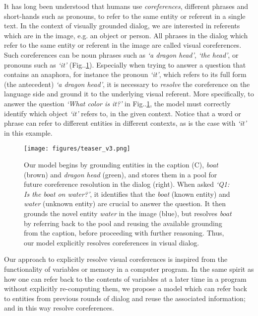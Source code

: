 \documentclass[runningheads]{llncs}
\makeatletter
\DeclareRobustCommand\onedot{\futurelet\@let@token\@onedot}
\def\@onedot{\ifx\@let@token.\else.\null\fi\xspace}
\def\Fig{Fig\onedot}
\makeatother
\begin{document}
It has long been understood 
\cite{grice1975logic,Winograd:1972:UNL:540414,mitchell-vandeemter-reiter:2013:NAACL-HLT,yu16eccv} 
that humans use \emph{coreferences}, different phrases and short-hands such as pronouns, to refer to the same entity or referent in a single text. In the context of visually grounded dialog, we are interested in referents which are in the image, e.g. an object or person. All phrases in the dialog which refer to the same entity or referent in the image are called visual coreferences.
Such coreferences can be noun phrases such as \emph{`a dragon head'}, 
\emph{`the head'}, or pronouns such as \emph{`it'} (\Fig\ref{fig:teaser}).
Especially when trying to answer a question that contains an anaphora, for
instance the pronoun \emph{`it'}, which refers to its full form (the antecedent) \emph{`a dragon head'}, it is necessary to \textit{resolve} the coreference 
on the language side and ground it to the underlying visual referent.
More specifically, to answer the question \textit{`What color is it?'} in
\Fig\ref{fig:teaser}, the model must correctly identify which object 
\textit{`it'} refers to, in the given context.
Notice that a word or phrase can refer to different entities in 
different contexts, as is the case with \textit{`it'} in this example.
\begin{figure}[t]
	\centering
    \texttt{[image: figures/teaser\_v3.png]}
\caption{
    Our model begins by grounding entities in the caption (C), \textit{boat} 
    (brown) and \textit{dragon head} (green), and stores them in a pool for 
    future coreference resolution in the dialog (right).
    When asked \textit{`Q1: Is the boat on water?'}, it identifies that
    the \textit{boat} (known entity) and \textit{water} (unknown entity) 
    are crucial to answer the question.
    It then grounds the novel entity \textit{water} in the image (blue), but 
    resolves \textit{boat} by referring back to the pool and reusing the 
    available grounding from the caption, before proceeding with further 
    reasoning.
    Thus, our model explicitly resolves coreferences in visual dialog.} 
\label{fig:teaser}
\end{figure}
Our approach to explicitly resolve visual coreferences is inspired from the 
functionality of variables or memory in a computer program.
In the same spirit as how one can refer back to the contents of variables at a 
later time in a program without explicitly re-computing them, we propose a 
model which can refer back to entities from previous rounds of dialog and 
reuse the associated information; and in this way resolve coreferences.
\end{document}
